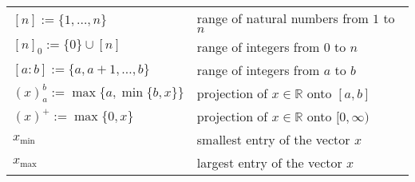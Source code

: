 \begin{tabularx}{\textwidth}{p{100pt}X}
    $[n] := \{1, \dots, n\}$ & range of natural numbers from $1$ to $n$ \\
    $[n]_0 := \{0\} \cup [n]$ & range of integers from $0$ to $n$ \\
    $[a : b] := \{a, a+1, \dots, b\}$ & range of integers from $a$ to $b$ \\
    $(x)_a^b := \max\{a, \min\{b, x\}\}$ & projection of $x \in \mathbb{R}$ onto $[a,b]$ \\
    $(x)^+ := \max\{0, x\}$ & projection of $x \in \mathbb{R}$ onto $[0, \infty)$ \\
    $x_{\text{min}}$ & smallest entry of the vector $x$ \\
    $x_{\text{max}}$ & largest entry of the vector $x$ \\
\end{tabularx}
